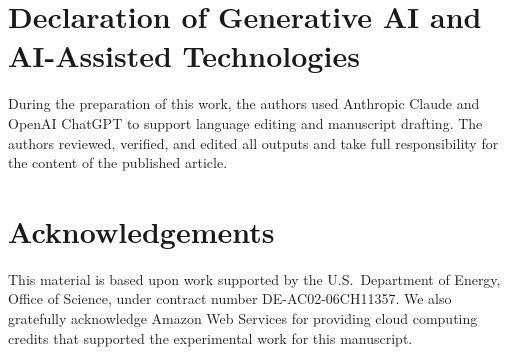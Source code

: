 \documentclass[preprint,12pt, a4paper]{elsarticle}
\begin{document}
\section*{Declaration of Generative AI and AI-Assisted Technologies}
During the preparation of this work, the authors used Anthropic Claude and OpenAI ChatGPT to support language editing and manuscript drafting. The authors reviewed, verified, and edited all outputs and take full responsibility for the content of the published article.

\section*{Acknowledgements}
\label{}
This material is based upon work supported by the U.S.\ Department of Energy, Office of Science, under contract number DE-AC02-06CH11357. We also gratefully acknowledge Amazon Web Services for providing cloud computing credits that supported the experimental work for this manuscript.







\end{document}
